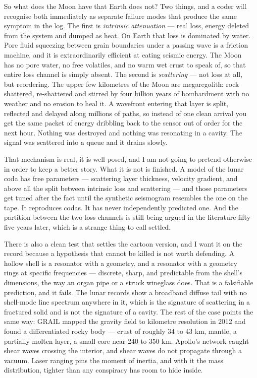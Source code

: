 So what does the Moon have that Earth does not? Two things, and a coder will recognise both
immediately as separate failure modes that produce the same symptom in the log. The first is
\emph{intrinsic attenuation} --- real loss, energy deleted from the system and dumped as heat. On
Earth that loss is dominated by water. Pore fluid squeezing between grain boundaries under a passing
wave is a friction machine, and it is extraordinarily efficient at eating seismic energy. The Moon
has no pore water, no free volatiles, and no warm wet crust to speak of, so that entire loss channel
is simply absent. The second is \emph{scattering} --- not loss at all, but reordering. The upper few
kilometres of the Moon are megaregolith: rock shattered, re-shattered and stirred by four billion
years of bombardment with no weather and no erosion to heal it. A wavefront entering that layer is
split, reflected and delayed along millions of paths, so instead of one clean arrival you get the
same packet of energy dribbling back to the sensor out of order for the next hour. Nothing was
destroyed and nothing was resonating in a cavity. The signal was scattered into a queue and it drains
slowly.

That mechanism is real, it is well posed, and I am not going to pretend otherwise in order to keep a
better story. What it is not is finished. A model of the lunar coda has free parameters --- scattering
layer thickness, velocity gradient, and above all the split between intrinsic loss and scattering ---
and those parameters get tuned after the fact until the synthetic seismogram resembles the one on the
tape. It reproduces codas. It has never independently predicted one. And the partition between the
two loss channels is still being argued in the literature fifty-five years later, which is a strange
thing to call settled.

There is also a clean test that settles the cartoon version, and I want it on the record because a
hypothesis that cannot be killed is not worth defending. A hollow shell is a resonator with a
geometry, and a resonator with a geometry rings at specific frequencies --- discrete, sharp, and
predictable from the shell's dimensions, the way an organ pipe or a struck wineglass does. That is a
falsifiable prediction, and it fails. The lunar records show a broadband diffuse tail with no
shell-mode line spectrum anywhere in it, which is the signature of scattering in a fractured solid
and is not the signature of a cavity. The rest of the case points the same way: GRAIL mapped the
gravity field to kilometre resolution in 2012 and found a differentiated rocky body --- crust of
roughly 34 to 43 km, mantle, a partially molten layer, a small core near 240 to 350 km. Apollo's
network caught shear waves crossing the interior, and shear waves do not propagate through a vacuum.
Laser ranging pins the moment of inertia, and with it the mass distribution, tighter than any
conspiracy has room to hide inside.

